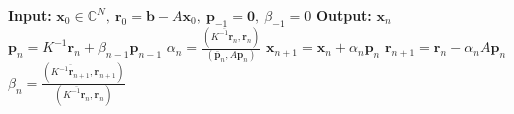 \begin{algorithm}[H]\caption{}\label{alg:pcocg}\begin{algorithmic}[1]
\Statex\textbf{Input:} $\bm x_0\in\mathbb C^N,\ \bm r_0=\bm b-A\bm x_0,\ \bm p_{-1}=\bm0,\ \beta_{-1}=0$
\Statex\textbf{Output:} $\bm x_n$
\State $\bm p_n=K^{-1}\bm r_n+\beta_{n-1}\bm p_{n-1}$
\State $\alpha_n=\frac{(\overline{K^{-1}\bm r_n},\bm r_n)}{(\bar{\bm p}_n,A\bm p_n)}$
\State $\bm x_{n+1}=\bm x_n+\alpha_n\bm p_n$
\State $\bm r_{n+1}=\bm r_n-\alpha_nA\bm p_n$
\State $\beta_n=\frac{(\overline{K^{-1}\bm r_{n+1}},\bm r_{n+1})}{(\overline{K^{-1}\bm r_n},\bm r_n)}$
\EndFor\end{algorithmic}\end{algorithm}
